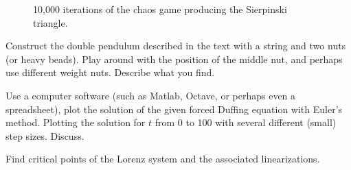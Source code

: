 \documentclass[12pt]{book}
\begin{document}
\begin{figure}[h!t]
\capstart
\begin{center}
\caption{10,000 iterations of the chaos game producing the 
Sierpinski triangle. \label{nlin:sierpinski}}
\end{center}
\end{figure}

\begin{exercise}[project]
Construct the double pendulum described in the text with a string and two
nuts (or heavy beads).  Play around with the position of the middle nut, and
perhaps use different weight nuts.  Describe what you find.
\end{exercise}

\begin{exercise}
Use a computer software (such as Matlab, Octave, or
perhaps even a spreadsheet), plot the solution
of the given forced Duffing equation with Euler's method.  Plotting the
solution for $t$ from 0 to 100 with several different (small) step sizes.
Discuss.
\end{exercise}

\setcounter{exercise}{100}

\begin{exercise}
Find critical points of the Lorenz system and the associated linearizations.
\end{exercise}




\end{document}
